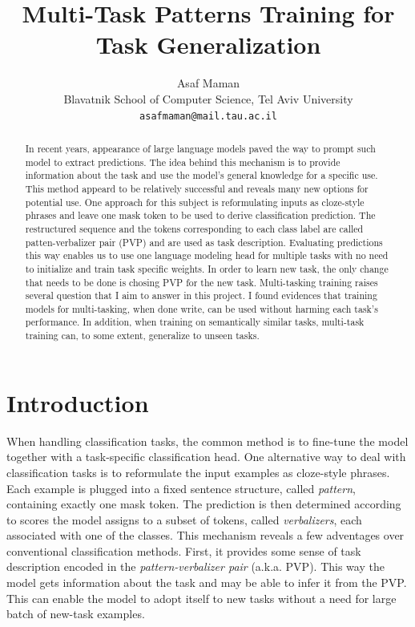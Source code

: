 \documentclass[11pt,a4paper]{article}
\title{Multi-Task Patterns Training for Task Generalization}
\author{Asaf Maman \\
  Blavatnik School of Computer Science, Tel Aviv University \\
  \texttt{asafmaman@mail.tau.ac.il} \\}
\date{}
\begin{document}
\maketitle

\begin{abstract}
In recent years, appearance of large language models paved the way to prompt such model to extract predictions.
The idea behind this mechanism is to provide information about the task and use the model's general knowledge for a specific use.
This method appeard to be relatively successful and reveals many new options for potential use.
One approach for this subject is reformulating inputs as cloze-style phrases and leave one mask token to be used to derive classification prediction.
The restructured sequence and the tokens corresponding to each class label are called patten-verbalizer pair (PVP) and are used as task description.
Evaluating predictions this way enables us to use one language modeling head for multiple tasks with no need to initialize and train task specific weights.
In order to learn new task, the only change that needs to be done is chosing PVP for the new task. 
Multi-tasking training raises several question that I aim to answer in this project.
I found evidences that training models for multi-tasking, when done write, can be used without harming each task's performance.
In addition, when training on semantically similar tasks, multi-task training can, to some extent, generalize to unseen tasks.
\end{abstract}


\section{Introduction}

When handling classification tasks, the common method is to fine-tune the model together with a task-specific classification head.
One alternative way to deal with classification tasks is to reformulate the input examples as cloze-style phrases.
Each example is plugged into a fixed sentence structure, called \textit{pattern}, containing exactly one mask token.
The prediction is then determined according to scores the model assigns to a subset of tokens, called \textit{verbalizers}, each associated with one of the classes.
This mechanism reveals a few adventages over conventional classification methods.
First, it provides some sense of task description encoded in the \textit{pattern-verbalizer pair} (a.k.a. PVP).
This way the model gets information about the task and may be able to infer it from the PVP.
This can enable the model to adopt itself to new tasks without a need for large batch of new-task examples.
\end{document}
